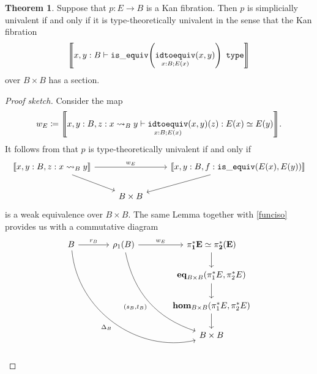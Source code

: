 \documentclass[10pt,letterpaper,cm]{nupset}
\theoremstyle{definition}
\theoremstyle{theorem}
\newtheorem{theorem}[definition]{Theorem}
\theoremstyle{remark}
\newcommand{\0}{\mathbf{0}}
\newcommand{\1}{\mathbf{1}}
\newcommand{\2}{\mathbf{2}}
\DeclareMathOperator{\type}{\mathtt{type}}
\DeclareMathOperator{\isequiv}{\mathtt{is\_equiv}}
\DeclareMathOperator{\equiveq}{\mathtt{idtoequiv}}
\begin{document}
\begin{theorem}
Suppose that $p:E \to B$ is a Kan fibration.  Then $p$ is simplicially univalent if and only if it is type-theoretically univalent in the sense that the Kan fibration $$\mleft\llbracket{x,y:B \vdash \isequiv\mleft(\equiveq_{{x:B}; E(x)}(x,y)\mright)\ \type}\mright\rrbracket$$ over $B\times B$ has a section.
\end{theorem}
\begin{proof}[Proof sketch]
Consider the map 
\[
w_E\coloneqq \mleft\llbracket{x,y:B, z: x\leadsto_B y \vdash  \equiveq_{{x:B}; E(x)}(x,y)(z) : E(x) \simeq E(y)}\mright\rrbracket
.\] It follows from \cite[Lemma 3.3.2]{KL} that $p$ is type-theoretically univalent if and only if
\[
\begin{tikzcd}
{\mleft\llbracket{x,y:B, z: x\leadsto_B y}\mright\rrbracket} \arrow[rd] \arrow[rr, "w_E"] &           & {\mleft\llbracket{x,y:B, f: \isequiv\mleft(E(x), E(y)\mright)}\mright\rrbracket} \arrow[ld] \\
                                                                                                                                                                                                                      & B\times B &                                                                                        
\end{tikzcd}
\]  is a weak equivalence over $B\times B$. The same Lemma together with \cref{funciso} provides us with a commutative diagram
\[
\begin{tikzcd}[column sep=large]
B \arrow[r, "r_B"] \arrow[rrddd, "\Delta_B"', bend right=49] & \rho_1(B) \arrow[rddd, "{\mleft(s_B, t_B\mright)}"', bend right] \arrow[r, "w_E"] & \mathbf{\pi_1^{\ast}{E}\simeq \pi_2^{\ast}(E)} \arrow[d]                          \\
                                                             &                                                                                 & {\mathbf{eq}_{B\times B}\mleft(\pi_1^{\ast}{E}, \pi_2^{\ast}{E}\mright)} \arrow[d]  \\
                                                             &                                                                                 & {\mathbf{hom}_{B\times B}\mleft(\pi_1^{\ast}{E}, \pi_2^{\ast}{E}\mright)} \arrow[d] \\
                                                             &                                                                                 & B\times B                                                                        

\end{tikzcd}\]
\end{proof}
\end{document}

